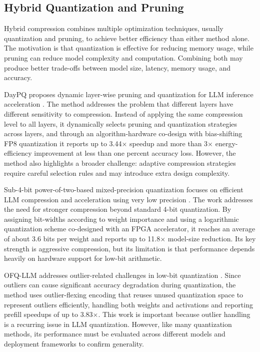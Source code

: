 \documentclass[
11pt, %
english, %
singlespacing, %
headsepline, %
]{MastersDoctoralThesis} %
\begin{document}
\subsection{Hybrid Quantization and Pruning}

Hybrid compression combines multiple optimization techniques, usually quantization and pruning, to achieve better efficiency than either method alone. The motivation is that quantization is effective for reducing memory usage, while pruning can reduce model complexity and computation. Combining both may produce better trade-offs between model size, latency, memory usage, and accuracy.

DayPQ proposes dynamic layer-wise pruning and quantization for LLM inference acceleration \cite{xu2026daypq}. The method addresses the problem that different layers have different sensitivity to compression. Instead of applying the same compression level to all layers, it dynamically selects pruning and quantization strategies across layers, and through an algorithm-hardware co-design with bias-shifting FP8 quantization it reports up to 3.44$\times$ speedup and more than 3$\times$ energy-efficiency improvement at less than one percent accuracy loss. However, the method also highlights a broader challenge: adaptive compression strategies require careful selection rules and may introduce extra design complexity.

Sub-4-bit power-of-two-based mixed-precision quantization focuses on efficient LLM compression and acceleration using very low precision \cite{cho2025sub4bit}. The work addresses the need for stronger compression beyond standard 4-bit quantization. By assigning bit-widths according to weight importance and using a logarithmic quantization scheme co-designed with an FPGA accelerator, it reaches an average of about 3.6 bits per weight and reports up to 11.8$\times$ model-size reduction. Its key strength is aggressive compression, but its limitation is that performance depends heavily on hardware support for low-bit arithmetic.

OFQ-LLM addresses outlier-related challenges in low-bit quantization \cite{wang2025ofqllm}. Since outliers can cause significant accuracy degradation during quantization, the method uses outlier-flexing encoding that reuses unused quantization space to represent outliers efficiently, handling both weights and activations and reporting prefill speedups of up to 3.83$\times$. This work is important because outlier handling is a recurring issue in LLM quantization. However, like many quantization methods, its performance must be evaluated across different models and deployment frameworks to confirm generality.
\end{document}
